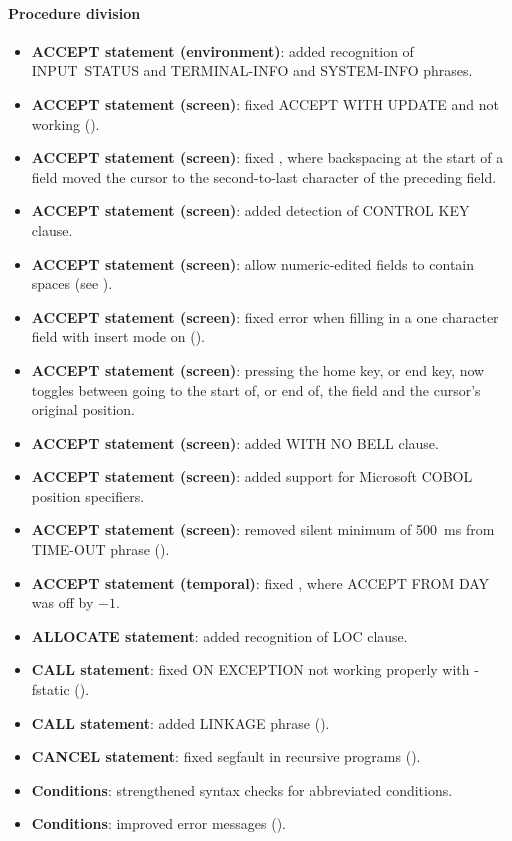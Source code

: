 \paragraph{Procedure division}
\begin{itemize}
\item \textbf{ACCEPT statement (environment)}: added recognition of INPUT~STATUS and TERMINAL-INFO and SYSTEM-INFO phrases. 
\item \textbf{ACCEPT statement (screen)}: fixed ACCEPT WITH UPDATE and not working ().
\item \textbf{ACCEPT statement (screen)}: fixed , where backspacing at the start of a field moved the cursor to the second-to-last character of the preceding field.
\item \textbf{ACCEPT statement (screen)}: added detection of CONTROL KEY clause.
\item \textbf{ACCEPT statement (screen)}: allow numeric-edited fields to contain spaces (see ).
\item \textbf{ACCEPT statement (screen)}: fixed error when filling in a one character field with insert mode on ().
\item \textbf{ACCEPT statement (screen)}: pressing the home key, or end key, now toggles between going to the start of, or end of, the field and the cursor's original position.
\item \textbf{ACCEPT statement (screen)}: added WITH NO BELL clause.
\item \textbf{ACCEPT statement (screen)}: added support for Microsoft COBOL position specifiers.
\item \textbf{ACCEPT statement (screen)}: removed silent minimum of 500~ms from TIME-OUT phrase ().
\item \textbf{ACCEPT statement (temporal)}: fixed , where ACCEPT FROM DAY was off by $-1$.
\item \textbf{ALLOCATE statement}: added recognition of LOC clause.
\item \textbf{CALL statement}: fixed ON EXCEPTION not working properly with -fstatic ().
\item \textbf{CALL statement}: added LINKAGE phrase ().
\item \textbf{CANCEL statement}: fixed segfault in recursive programs ().
\item \textbf{Conditions}: strengthened syntax checks for abbreviated conditions.
\item \textbf{Conditions}: improved error messages ().

\end{itemize}
